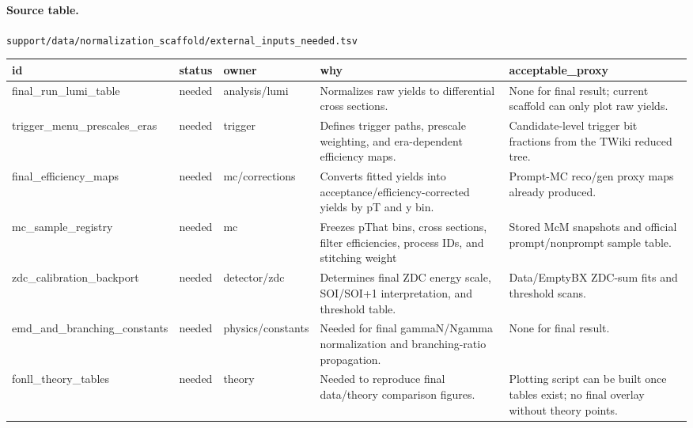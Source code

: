 \documentclass[11pt]{article}
\begin{document}
\paragraph{Source table.} \texttt{support/data/normalization\_scaffold/external\_inputs\_needed.tsv}
\begin{center}\scriptsize
\begin{tabular}{|l|l|l|l|l|}
\hline
id & status & owner & why & acceptable\_proxy \\ \hline
final\_run\_lumi\_table & needed & analysis/lumi & Normalizes raw yields to differential cross sections. & None for final result; current scaffold can only plot raw yields. \\ \hline
trigger\_menu\_prescales\_eras & needed & trigger & Defines trigger paths, prescale weighting, and era-dependent efficiency maps. & Candidate-level trigger bit fractions from the TWiki reduced tree. \\ \hline
final\_efficiency\_maps & needed & mc/corrections & Converts fitted yields into acceptance/efficiency-corrected yields by pT and y bin. & Prompt-MC reco/gen proxy maps already produced. \\ \hline
mc\_sample\_registry & needed & mc & Freezes pThat bins, cross sections, filter efficiencies, process IDs, and stitching weight & Stored McM snapshots and official prompt/nonprompt sample table. \\ \hline
zdc\_calibration\_backport & needed & detector/zdc & Determines final ZDC energy scale, SOI/SOI+1 interpretation, and threshold table. & Data/EmptyBX ZDC-sum fits and threshold scans. \\ \hline
emd\_and\_branching\_constants & needed & physics/constants & Needed for final gammaN/Ngamma normalization and branching-ratio propagation. & None for final result. \\ \hline
fonll\_theory\_tables & needed & theory & Needed to reproduce final data/theory comparison figures. & Plotting script can be built once tables exist; no final overlay without theory points. \\ \hline
\end{tabular}
\end{center}
\end{document}
